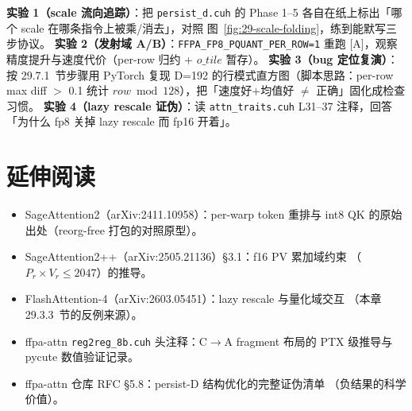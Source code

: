 \textbf{实验 1（scale 流向追踪）}：把 \texttt{persist\_d.cuh} 的
Phase 1--5 各自在纸上标出「哪个 scale 在哪条指令上被乘/消去」，对照
图~\ref{fig:29-scale-folding}，练到能默写三步协议。
\textbf{实验 2（发射域 A/B）}：\texttt{FFPA\_FP8\_PQUANT\_PER\_ROW=1}
重跑 [A]，观察精度提升与速度代价（per-row 归约 + $o\_tile$ 暂存）。
\textbf{实验 3（bug 定位复演）}：按 29.7.1~节步骤用 PyTorch 复现 D=192
的行模式直方图（脚本思路：per-row max diff $>$ 0.1 统计
$row\bmod128$），把「速度好+均值好 $\neq$ 正确」固化成检查习惯。
\textbf{实验 4（lazy rescale 证伪）}：读 \texttt{attn\_traits.cuh}
L31--37 注释，回答「为什么 fp8 关掉 lazy rescale 而 fp16 开着」。

\section*{延伸阅读}
\begin{itemize}[itemsep=0pt,topsep=2pt]
  \item SageAttention2（arXiv:2411.10958）：per-warp token 重排与 int8 QK
        的原始出处（reorg-free 打包的对照原型）。
  \item SageAttention2++（arXiv:2505.21136）\S3.1：f16 PV 累加域约束
        （$P_r\times V_r\le2047$）的推导。
  \item FlashAttention-4（arXiv:2603.05451）：lazy rescale 与量化域交互
        （本章 29.3.3~节的反例来源）。
  \item ffpa-attn \texttt{reg2reg\_8b.cuh} 头注释：C$\to$A fragment
        布局的 PTX 级推导与 pycute 数值验证记录。
  \item ffpa-attn 仓库 RFC \S5.8：persist-D 结构优化的完整证伪清单
        （负结果的科学价值）。
\end{itemize}
